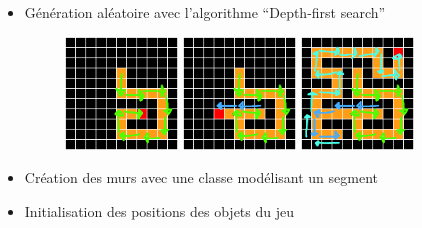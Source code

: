 \documentclass[handout]{beamer}
\begin{document}
\begin{frame}
  \frametitle<1->{}
    \begin{itemize}
    \item <1->{Génération aléatoire avec l'algorithme \enquote{Depth-first search}}
    \begin{figure}[htp]
      \centering
      \includegraphics[width=.3\textwidth, height=30mm]{DFS1.png}\hfill
      \includegraphics[width=.3\textwidth, height=30mm]{DFS2.png}\hfill
      \includegraphics[width=.3\textwidth, height=30mm]{DFS3.png}
    \end{figure}
    \item <2->{Création des murs avec une classe modélisant un segment}
    \item <3->{Initialisation des positions des objets du jeu}
    \end{itemize}
\end{frame}
\end{document}
